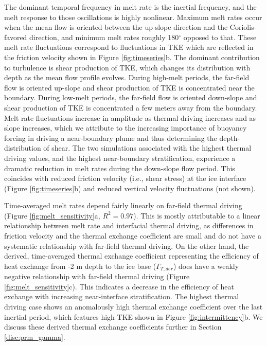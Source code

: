 \documentclass[draft]{styles/agujournal2019}
\begin{document}
The dominant temporal frequency in melt rate is the inertial frequency, and the melt response to those oscillations is highly nonlinear. Maximum melt rates occur when the mean flow is oriented between the up-slope direction and the Coriolis-favored direction, and minimum melt rates roughly 180$^{\circ}$ opposed to that. These melt rate fluctuations correspond to fluctuations in TKE which are reflected in the friction velocity shown in Figure \ref{fig:timeseries}b. The dominant contribution to turbulence is shear production of TKE, which changes its distribution with depth as the mean flow profile evolves. During high-melt periods, the far-field flow is oriented up-slope and shear production of TKE is concentrated near the boundary. During low-melt periods, the far-field flow is oriented down-slope and shear production of TKE is concentrated a few meters away from the boundary. Melt rate fluctuations increase in amplitude as thermal driving increases and as slope increases, which we attribute to the increasing importance of buoyancy forcing in driving a near-boundary plume and thus determining the depth-distribution of shear. The two simulations associated with the highest thermal driving values, and the highest near-boundary stratification, experience a dramatic reduction in melt rates during the down-slope flow period. This coincides with reduced friction velocity (i.e., shear stress) at the ice interface (Figure \ref{fig:timeseries}b) and reduced vertical velocity fluctuations (not shown). 

Time-averaged melt rates depend fairly linearly on far-field thermal driving (Figure \ref{fig:melt_sensitivity}a, $R^2=0.97$). This is mostly attributable to a linear relationship between melt rate and interfacial thermal driving, as differences in friction velocity and the thermal exchange coefficient are small and do not have a systematic relationship with far-field thermal driving. On the other hand, the derived, time-averaged thermal exchange coefficient representing the efficiency of heat exchange from -2 m depth to the ice base ($\Gamma_{T,der}$) does have a weakly negative relationship with far-field thermal driving (Figure \ref{fig:melt_sensitivity}c). This indicates a decrease in the efficiency of heat exchange with increasing near-interface stratification. The highest thermal driving case shows an anomalously high thermal exchange coefficient over the last inertial period, which features high TKE shown in Figure \ref{fig:intermittency}b. We discuss these derived thermal exchange coefficients further in Section \ref{disc:prm_gamma}.
\end{document}
